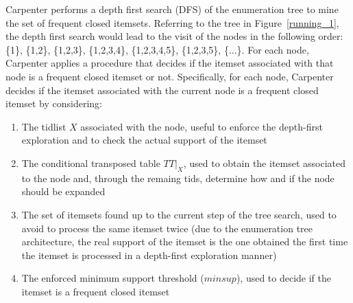 Carpenter performs a depth first search (DFS) of the enumeration tree to mine the set
of frequent closed itemsets.
Referring to the tree in Figure~\ref{running_1}, the depth first search would
lead to the visit of the nodes in the following order:
\{1\}, \{1,2\}, \{1,2,3\}, \{1,2,3,4\}, \{1,2,3,4,5\}, \{1,2,3,5\}, \{...\}.
For each node, Carpenter applies a procedure that decides if the itemset
associated with that node is a frequent closed itemset or not.
Specifically, for each node, Carpenter decides if the itemset associated with
the current node is a frequent closed  itemset
by considering: \begin{enumerate}
\item The tidlist $X$ associated with the node, useful to enforce the depth-first exploration and to check the actual support of the itemset
\item The conditional transposed table $TT|_{X}$, used to obtain the itemset associated to the node and, through the remaing tids, determine how and if the node should be expanded
\item The set of itemsets found up to the current step of the tree search, used to avoid to process the same itemset twice (due to the enumeration tree architecture, the real support of the itemset is the one obtained the first time the itemset is processed in a depth-first exploration manner)
\item The enforced minimum support threshold ($minsup$), used to decide if the itemset is a frequent closed itemset
\end{enumerate}
